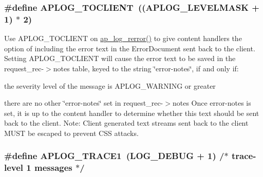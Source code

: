 \subsubsection[{\texorpdfstring{A\+P\+L\+O\+G\+\_\+\+T\+O\+C\+L\+I\+E\+NT}{APLOG_TOCLIENT}}]{\setlength{\rightskip}{0pt plus 5cm}\#define A\+P\+L\+O\+G\+\_\+\+T\+O\+C\+L\+I\+E\+NT~(({\bf A\+P\+L\+O\+G\+\_\+\+L\+E\+V\+E\+L\+M\+A\+SK} + 1) $\ast$ 2)}\hypertarget{group__APACHE__CORE__LOG_ga5d58a2410e5f8be30429161385acd8dc}{}\label{group__APACHE__CORE__LOG_ga5d58a2410e5f8be30429161385acd8dc}
Use A\+P\+L\+O\+G\+\_\+\+T\+O\+C\+L\+I\+E\+NT on \hyperlink{group__APACHE__CORE__LOG_ga4c112558ccffd6b363da102b2052d2a6}{ap\+\_\+log\+\_\+rerror()} to give content handlers the option of including the error text in the Error\+Document sent back to the client. Setting A\+P\+L\+O\+G\+\_\+\+T\+O\+C\+L\+I\+E\+NT will cause the error text to be saved in the request\+\_\+rec-\/$>$notes table, keyed to the string \char`\"{}error-\/notes\char`\"{}, if and only if\+:
\begin{DoxyItemize}
\item the severity level of the message is A\+P\+L\+O\+G\+\_\+\+W\+A\+R\+N\+I\+NG or greater
\item there are no other \char`\"{}error-\/notes\char`\"{} set in request\+\_\+rec-\/$>$notes Once error-\/notes is set, it is up to the content handler to determine whether this text should be sent back to the client. Note\+: Client generated text streams sent back to the client M\+U\+ST be escaped to prevent C\+SS attacks. 
\end{DoxyItemize}
\subsubsection[{\texorpdfstring{A\+P\+L\+O\+G\+\_\+\+T\+R\+A\+C\+E1}{APLOG_TRACE1}}]{\setlength{\rightskip}{0pt plus 5cm}\#define A\+P\+L\+O\+G\+\_\+\+T\+R\+A\+C\+E1~(L\+O\+G\+\_\+\+D\+E\+B\+UG + 1)  /$\ast$ trace-\/{\bf level} 1 messages $\ast$/}\hypertarget{group__APACHE__CORE__LOG_gab08ab6d0e9ab24707ce7baeaecf1f551}{}\label{group__APACHE__CORE__LOG_gab08ab6d0e9ab24707ce7baeaecf1f551}
